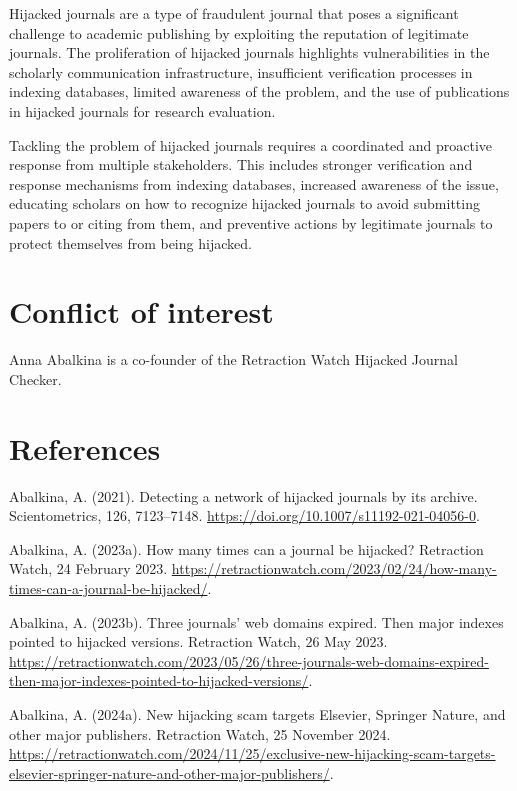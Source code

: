\documentclass[a4paper,
fontsize=11pt,
oneside,
numbers=noperiodatend,
parskip=half-,
bibliography=totoc,
final
]{scrartcl}
\begin{document}
Hijacked journals are a type of fraudulent journal that poses a
significant challenge to academic publishing by exploiting the
reputation of legitimate journals. The proliferation of hijacked
journals highlights vulnerabilities in the scholarly communication
infrastructure, insufficient verification processes in indexing
databases, limited awareness of the problem, and the use of publications
in hijacked journals for research evaluation.

Tackling the problem of hijacked journals requires a coordinated and
proactive response from multiple stakeholders. This includes stronger
verification and response mechanisms from indexing databases, increased
awareness of the issue, educating scholars on how to recognize hijacked
journals to avoid submitting papers to or citing from them, and
preventive actions by legitimate journals to protect themselves from
being hijacked.

\section{Conflict of interest}\label{conflict-of-interest}

Anna Abalkina is a co-founder of the Retraction Watch Hijacked Journal
Checker.

\section{References}\label{references}

Abalkina, A. (2021). Detecting a network of hijacked journals by its
archive. Scientometrics, 126, 7123--7148.
\url{https://doi.org/10.1007/s11192-021-04056-0}.

Abalkina, A. (2023a). How many times can a journal be hijacked?
Retraction Watch, 24 February 2023.
\url{https://retractionwatch.com/2023/02/24/how-many-times-can-a-journal-be-hijacked/}.

Abalkina, A. (2023b). Three journals' web domains expired. Then major
indexes pointed to hijacked versions. Retraction Watch, 26 May 2023.
\url{https://retractionwatch.com/2023/05/26/three-journals-web-domains-expired-then-major-indexes-pointed-to-hijacked-versions/}.

Abalkina, A. (2024a). New hijacking scam targets Elsevier, Springer
Nature, and other major publishers. Retraction Watch, 25 November 2024.
\url{https://retractionwatch.com/2024/11/25/exclusive-new-hijacking-scam-targets-elsevier-springer-nature-and-other-major-publishers/}.
\end{document}
